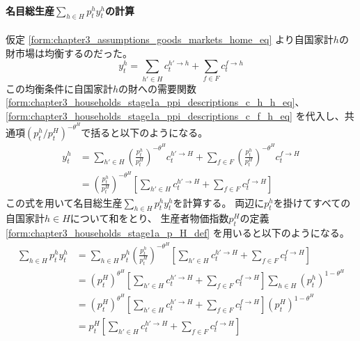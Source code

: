 \paragraph{名目総生産\(\sum_{h\in H}p_t^hy_t^h\)の計算}
\label{sec:chapter3_producers_aggregated_production_home_nominal_aggregated_production}
仮定
\eqref{form:chapter3_assumptions_goods_markets_home_eq}
より自国家計\(h\)の財市場は均衡するのだった。
\begin{equation}
\label{form:chapter3_producers_aggregated_production_home_nominal_aggregated_production_y_h_eq}
    y_t^h=\sum_{h'\in H}c_t^{h'\to h}+\sum_{f\in F}c_t^{f\to h}
\end{equation}
この均衡条件に自国家計\(h\)の財への需要関数
\eqref{form:chapter3_households_stage1a_ppi_descriptions_c_h_h_eq}、
\eqref{form:chapter3_households_stage1a_ppi_descriptions_c_f_h_eq}
を代入し、共通項\((p_t^h/p_t^H)^{-\theta^H}\)で括ると以下のようになる。
\begin{align}
\label{form:chapter3_producers_aggregated_production_home_nominal_aggregated_production_y_h_modified_eq}
    y_t^h
    &=\sum_{h'\in H}\left(\frac{p_t^h}{p_t^H}\right)^{-\theta^H}c_t^{h'\to H}+\sum_{f\in F}\left(\frac{p_t^h}{p_t^H}\right)^{-\theta^H}c_t^{f\to H} \nonumber \\
    &=\left(\frac{p_t^h}{p_t^H}\right)^{-\theta^H}\left[\sum_{h'\in H}c_t^{h'\to H}+\sum_{f\in F}c_t^{f\to H}\right]
\end{align}
この式を用いて名目総生産\(\sum_{h\in H}p_t^hy_t^h\)を計算する。
両辺に\(p_t^h\)を掛けてすべての自国家計\(h\in H\)について和をとり、
生産者物価指数\(p_t^H\)の定義
\eqref{form:chapter3_households_stage1a_p_H_def}
を用いると以下のようになる。
\begin{align}
\label{form:chapter3_producers_aggregated_production_home_nominal_aggregated_production_sum_p_h_y_h_eq}
    \sum_{h\in H}p_t^hy_t^h
    &=\sum_{h\in H}p_t^h\left(\frac{p_t^h}{p_t^H}\right)^{-\theta^H}\left[\sum_{h'\in H}c_t^{h'\to H}+\sum_{f\in F}c_t^{f\to H}\right] \nonumber \\
    &=(p_t^H)^{\theta^H}\left[\sum_{h'\in H}c_t^{h'\to H}+\sum_{f\in F}c_t^{f\to H}\right]\sum_{h\in H}(p_t^h)^{1-\theta^H} \nonumber \\
    &=(p_t^H)^{\theta^H}\left[\sum_{h'\in H}c_t^{h'\to H}+\sum_{f\in F}c_t^{f\to H}\right](p_t^H)^{1-\theta^H} \nonumber \\
    &=p_t^H\left[\sum_{h'\in H}c_t^{h'\to H}+\sum_{f\in F}c_t^{f\to H}\right]
\end{align}

